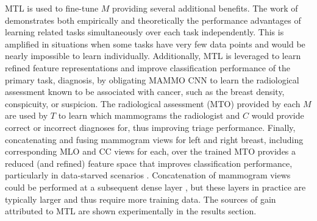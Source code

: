 \documentclass[journal]{IEEEtran}
\begin{document}
MTL is used to fine-tune $M$ providing several additional benefits.  The work of \cite{argyriou-2006} demonstrates both empirically and theoretically the performance advantages of learning related tasks simultaneously over each task independently.  This is amplified in situations when some tasks have very few data points and would be nearly impossible to learn individually.  Additionally, MTL is leveraged to learn refined feature representations and improve classification performance of the primary task, diagnosis, by obligating MAMMO CNN to learn the radiological assessment known to be associated with cancer, such as the breast density, conspicuity, or suspicion.  The radiological assessment (MTO) provided by each $M$ are used by $T$ to learn which mammograms the radiologist and $C$ would provide correct or incorrect diagnoses for, thus improving triage performance. 
Finally, concatenating and fusing mammogram views for left and right breast, including corresponding MLO and CC views for each, over the trained MTO provides a reduced (and refined) feature space that improves classification performance, particularly in data-starved scenarios \cite{cascade-ensemble}.  Concatenation of mammogram views could be performed at a subsequent dense layer \cite{stacked-ensemble}, but these layers in practice are typically larger and thus require more training data.  The sources of gain attributed to MTL are shown experimentally in the results section.
\end{document}

